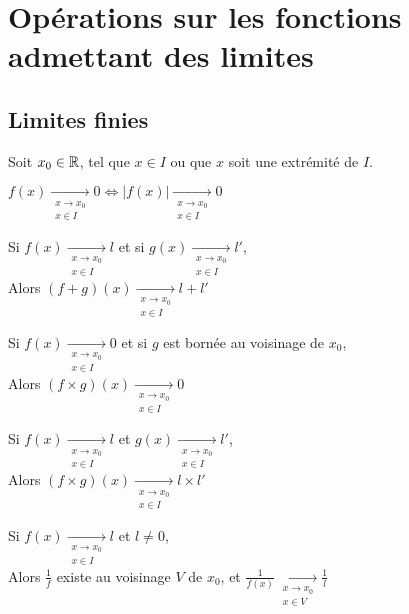\documentclass[12pt,twoside,a4paper]{article}
\author{MPSI 2}
\begin{document}
	\maketitle
	\section{Opérations sur les fonctions admettant des limites}
		\subsection{Limites finies}
			Soit $x_0\in\mathbb{R}$, tel que $x\in I$ ou que $x$ soit une extrémité de $I$.
			\begin{liste}
				\item $f(x)\mathop{\longrightarrow}\limits_{\substack{x\rightarrow x_0\\x\in I}}0\iff|f(x)|\mathop{\longrightarrow}\limits_{\substack{x\rightarrow x_0\\x\in I}}0$\\
				
				\item Si $f(x)\mathop{\longrightarrow}\limits_{\substack{x\rightarrow x_0\\x\in I}}l$ et si $g(x)\mathop{\longrightarrow}\limits_{\substack{x\rightarrow x_0\\x\in I}}l'$,\\
					Alors $(f+g)(x)\mathop{\longrightarrow}\limits_{\substack{x\rightarrow x_0\\x\in I}}l+l'$\\
				\item Si $f(x)\mathop{\longrightarrow}\limits_{\substack{x\rightarrow x_0\\x\in I}}0$ et si $g$ est bornée au voisinage de $x_0$,\\
					Alors $(f\times g)(x)\mathop{\longrightarrow}\limits_{\substack{x\rightarrow x_0\\x\in I}}0$\\
				\item Si $f(x)\mathop{\longrightarrow}\limits_{\substack{x\rightarrow x_0\\x\in I}}l$ et $g(x)\mathop{\longrightarrow}\limits_{\substack{x\rightarrow x_0\\x\in I}}l'$,\\
					Alors $(f\times g)(x)\mathop{\longrightarrow}\limits_{\substack{x\rightarrow x_0\\x\in I}}l\times l'$\\
				\item Si $f(x)\mathop{\longrightarrow}\limits_{\substack{x\rightarrow x_0\\x\in I}}l$ et $l\neq0$,\\
					Alors $\frac1{f}$ existe au voisinage $V$ de $x_0$, et $\frac1{f(x)}\mathop{\longrightarrow}\limits_{\substack{x\rightarrow x_0\\x\in V}}\frac1l$
			\end{liste}
\end{document}
